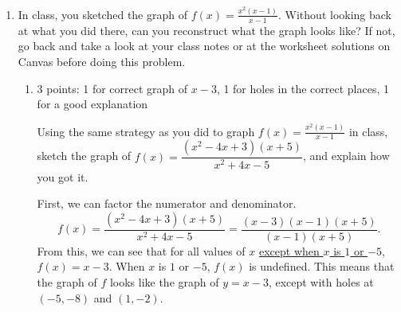 \documentclass{article}
\begin{document}
\begin{enumerate}
\begin{enumerate}
\begin{solution}
    \end{solution}

  \end{enumerate}

\item \label{graph-with-pinhole-2} 

  In class, you sketched the graph of $\displaystyle f(x) = \frac{x^2 (x - 1)}{x - 1}$. Without looking back at what you did there, can you reconstruct what the graph looks like? If not, go back and take a look at your class notes or at the worksheet solutions on Canvas before doing this problem.

  \begin{enumerate}
  \item

    \begin{grading}
      3 points: 1 for correct graph of $x - 3$, 1 for holes in the correct places, 1 for a good explanation
    \end{grading}

    \begin{problem}[\vfill]
      Using the same strategy as you did to graph $\displaystyle f(x) = \frac{x^2 (x - 1)}{x - 1}$ in class, sketch the graph of $f(x) = \dfrac{(x^2 - 4x + 3)(x + 5)}{x^2 + 4x - 5}$, and explain how you got it.
    \end{problem}

    \begin{solution}
      First, we can factor the numerator and denominator.
      \[
      f(x)=\dfrac{(x^2-4x+3)(x+5)}{x^2+4x-5} = \dfrac{(x-3)(x-1)(x+5)}{(x-1)(x+5)}.
      \]
      From this, we can see that for all values of $x$ \uline{except when $x$ is $1$ or $-5$},
      $f(x)=x-3$. When $x$ is $1$ or $-5$, $f(x)$ is undefined.
      This means that the graph of $f$ looks like the graph of $y=x-3$, except with holes
      at $(-5, -8)$ and $(1, -2)$.
      


\end{solution}
\end{enumerate}
\end{enumerate}
\end{document}
